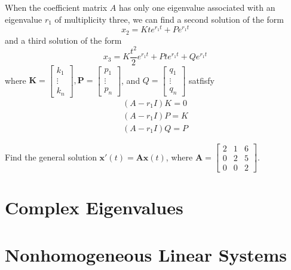 \documentclass[../diffeq.tex]{subfiles}
\begin{document}
When the coefficient matrix $A$ has only one eigenvalue associated with an eigenvalue $r_1$ of multiplicity three, we can find a second solution of the form 
\[ x_2 = Kte^{r_1t}+Pe^{r_1t} \]
and a third solution of the form 
\[ x_3 = K\frac{t^2}{2}e^{r_1t}+Pte^{r_1t}+Qe^{r_1t} \]
where $\textbf{K}=\begin{bmatrix}
    k_1 \\ \vdots \\ k_n
\end{bmatrix}, \textbf{P}=\begin{bmatrix}
    p_1 \\ \vdots \\ p_n
\end{bmatrix}$, and $Q=\begin{bmatrix}
    q_1 \\ \vdots \\ q_n
\end{bmatrix}$ satfisfy 
\begin{align*}
    (A-r_1I)K=0\\
    (A-r_1I)P=K\\
    (A-r_1I)Q=P
\end{align*}

\ex Find the general solution $\textbf{x}'(t)=\textbf{Ax}(t)$, where $\textbf{A}=\begin{bmatrix}
    2 & 1 & 6\\
    0 & 2 & 5\\
    0 & 0 & 2
\end{bmatrix}$.

\section{Complex Eigenvalues}
\section{Nonhomogeneous Linear Systems}
\end{document}
